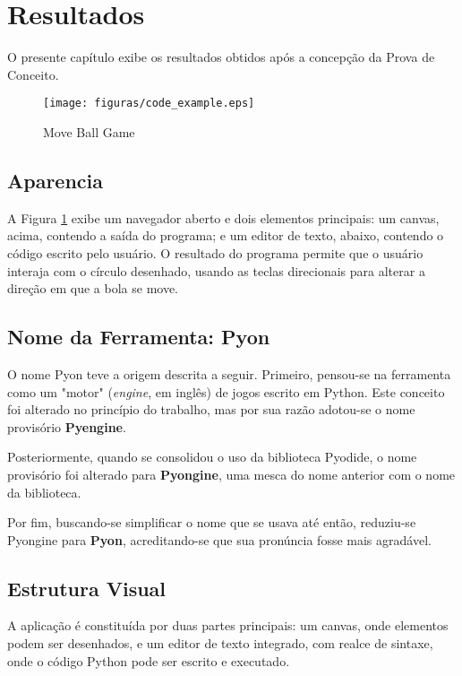 \chapter*[Resultados]{Resultados}

O presente capítulo exibe os resultados obtidos após a concepção da Prova de Conceito.

\begin{figure}[!ht]
    \centering
    \caption{Move Ball Game}
    \texttt{[image: figuras/code\_example.eps]}
    \label{fig:code}
\end{figure}

\section{Aparencia}

A Figura \ref{fig:code} exibe um navegador aberto e dois elementos principais: um canvas, acima, contendo a saída do programa; e um editor de texto, abaixo, contendo o código escrito pelo usuário. O resultado do programa permite que o usuário interaja com o círculo desenhado, usando as teclas direcionais para alterar a direção em que a bola se move. 

\section{Nome da Ferramenta: Pyon}

O nome Pyon teve a origem descrita a seguir. Primeiro, pensou-se na ferramenta como um "motor" 
(\textit{engine}, em inglês) de jogos escrito em Python. Este conceito foi alterado no princípio do trabalho, mas por sua razão adotou-se o nome provisório \textbf{Pyengine}.

Posteriormente, quando se consolidou o uso da biblioteca Pyodide, o nome provisório foi alterado para
\textbf{Pyongine}, uma mesca do nome anterior com o nome da biblioteca.

Por fim, buscando-se simplificar o nome que se usava até então, reduziu-se Pyongine para \textbf{Pyon},
acreditando-se que sua pronúncia fosse mais agradável.

\section{Estrutura Visual}

A aplicação é constituída por duas partes principais: um canvas, onde elementos podem ser desenhados, e um editor de texto integrado, com realce de sintaxe, onde o código Python pode ser escrito e executado.

